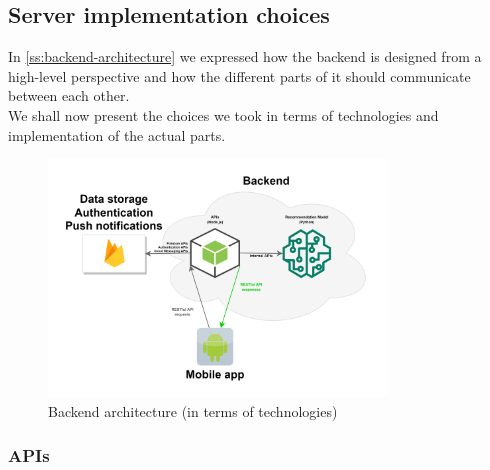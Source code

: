 \documentclass[../../main]{subfiles}
\begin{document}
\subsection{Server implementation choices}
\label{ss:server-implementation-choices}

In \ref{ss:backend-architecture} we expressed how the backend is designed from a high-level perspective and how the different parts of it should communicate between each other.\\
We shall now present the choices we took in terms of technologies and implementation of the actual parts.

\begin{figure}[h]
    \centering
    \includegraphics[width=0.8\textwidth]{images/backend_architecture_technologies}
    \caption{Backend architecture (in terms of technologies)}\label{fig:backend_architecture_technologies}
\end{figure}

\subsubsection{APIs}
\label{sss:apis}
\end{document}

